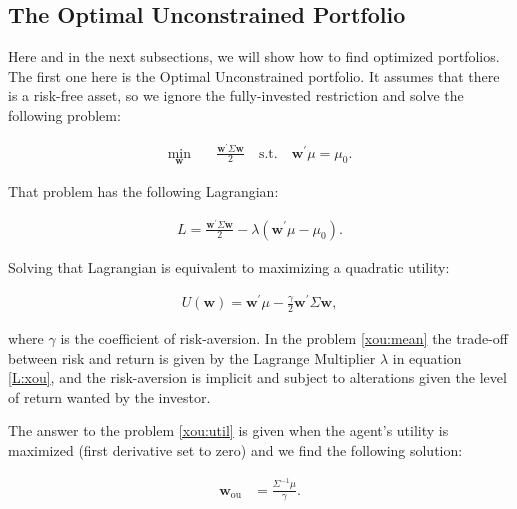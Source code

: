 \documentclass[12pt,oneside,a4paper]{memoir}
\begin{document}
\subsection{The Optimal Unconstrained Portfolio}

\noindent Here and in the next subsections, we will show how to find optimized portfolios. The first one here is the Optimal Unconstrained portfolio. It assumes that there is a risk-free asset, so we ignore the fully-invested restriction and solve the following problem:

\vspace{-12pt}
\begin{align}
\label{xou:mean}
\min_{\mathbf{w}} \quad & \frac{\mathbf{w}^{\prime} \Sigma \mathbf{w}}{2} \quad
\mathrm{s.t.} \quad \mathbf{w}^{\prime}\mu = \mu_{0}.
\end{align}

\noindent That problem has the following Lagrangian:

\begin{align} \label{L:xou}
L = \frac{\mathbf{w}^{\prime}\Sigma \mathbf{w}}{2} - \lambda (\mathbf{w}^{\prime} \mu - \mu_{0}).
\end{align}

Solving that Lagrangian is equivalent to maximizing a quadratic utility:

\vspace{-12pt}
\begin{align}
\label{xou:util}
U(\mathbf{w}) = \mathbf{w}^{\prime} \mu - \frac{\gamma}{2} \mathbf{w}^{\prime} \Sigma \mathbf{w},
\end{align}
 
\noindent
where $\gamma$ is the coefficient of risk-aversion.
In the problem \eqref{xou:mean} the trade-off between risk and return is given by the Lagrange Multiplier $\lambda$ in equation \eqref{L:xou}, and the risk-aversion is implicit and subject to alterations given the level of return wanted by the investor.

The answer to the problem \eqref{xou:util} is given when the agent's utility is maximized (first derivative set to zero) and we find the following solution:

\vspace{-12pt}
\begin{align}
\label{ou1}
\mathbf{w}_{\mathrm{ou}} & =\frac{ \Sigma^{-1} \mu }{ \gamma}.
\end{align}
\end{document}
